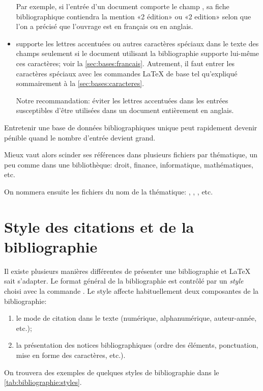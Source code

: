 \begin{itemize}
  Par exemple, si l'entrée d'un document comporte le champ
  , sa fiche bibliographique contiendra la mention
  «2{\ieme} édition» ou «2 edition» selon que l'on a précisé
  que l'ouvrage est en français ou en anglais.
\item {\BibTeX} supporte les lettres accentuées ou autres caractères
  spéciaux dans le texte des champs seulement si le document utilisant
  la bibliographie supporte lui-même ces caractères; voir la
  \autoref{sec:bases:francais}. Autrement, il faut entrer les
  caractères spéciaux avec les commandes {\LaTeX} de base tel
  qu'expliqué sommairement à la \autoref{sec:bases:caracteres}.

  Notre recommandation: éviter les lettres accentuées dans les
  entrées susceptibles d'être utilisées dans un document entièrement
  en anglais.
\end{itemize}

\begin{conseil}
  Entretenir une base de données bibliographiques unique peut
  rapidement devenir pénible quand le nombre d'entrée devient grand.

  Mieux vaut alors scinder ses références dans plusieurs fichiers par
  thématique, un peu comme dans une bibliothèque:
  droit, finance, informatique, mathématiques, etc.

  On nommera ensuite les fichiers du nom de la thématique:
  , ,
  , etc.
\end{conseil}



\section{Style des citations et de la bibliographie}
\label{sec:bibliographie:style}

Il existe plusieurs manières différentes de présenter une
bibliographie et {\LaTeX} sait s'adapter. Le format général de la
bibliographie est contrôlé par un \emph{style} choisi avec la commande
\cmd{}. Le style affecte habituellement deux
composantes de la bibliographie:
\begin{enumerate}
\item le mode de citation dans le texte (numérique, alphanumérique,
  auteur-année, etc.);
\item la présentation des notices bibliographiques (ordre des
  éléments, ponctuation, mise en forme des caractères, etc.).
\end{enumerate}
On trouvera des exemples de quelques styles de bibliographie dans le
\autoref{tab:bibliographie:styles}.

